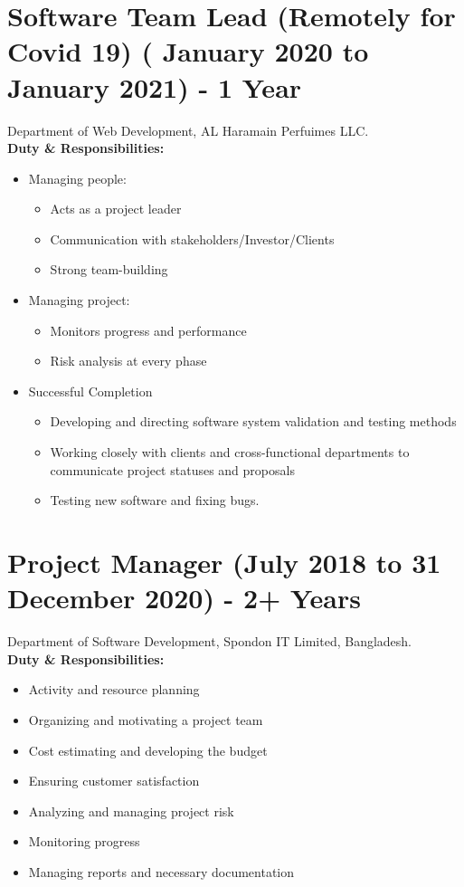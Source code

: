 \documentclass[10pt]{res}
\begin{document}
\begin{resume}
 
\vspace{20pt}
\section{Software Team Lead  (Remotely for Covid 19) ( January 2020 to January 2021) - 1 Year}
 Department of Web Development, AL Haramain Perfuimes LLC.\\
\textbf{Duty \& Responsibilities:}
\begin{itemize}
\item Managing people:
    \begin{itemize} 
        \item Acts as a project leader
        \item Communication with stakeholders/Investor/Clients 
        \item Strong team-building
    \end{itemize} 
\item Managing project:
    \begin{itemize} 
        \item Monitors progress and performance
        \item Risk analysis at every phase 
    \end{itemize}
    
    \item Successful Completion
        \begin{itemize} 
            \item Developing and directing software system validation and testing methods
            \item Working closely with clients and cross-functional departments to communicate project statuses and proposals
            \item Testing new software and fixing bugs.
        \end{itemize}
\end{itemize}
 
  

 
\vspace{20pt}
\section{Project Manager (July 2018 to 31 December 2020) - 2+ Years}
 Department of Software Development, Spondon IT Limited, Bangladesh.\\
\textbf{Duty \& Responsibilities:}
\begin{itemize}
    \item Activity and resource planning 
    \item Organizing and motivating a project team 
    \item Cost estimating and developing the budget 
    \item Ensuring customer satisfaction 
    \item Analyzing and managing project risk 
    \item Monitoring progress 
    \item Managing reports and necessary documentation 
\end{itemize}


\end{resume}
\end{document}
